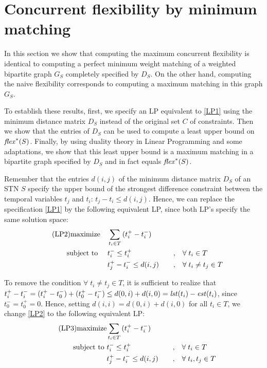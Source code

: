 \section{Concurrent flexibility by minimum matching}
In this section we show that computing the maximum concurrent flexibility is identical to computing a perfect minimum weight matching of a weighted bipartite graph $G_S$ completely specified by $D_S$. On the other hand, computing the naive flexibility corresponds to computing a maximum matching in this graph $G_S$.

To establish these results, first, we specify an LP equivalent to \ref{LP1} using the minimum distance matrix $D_S$ instead of the original set $C$ of constraints. 
Then we show that the entries of $D_S$ can be used to compute a least upper bound on $\mathit{flex}^*(S)$.
Finally, by using duality theory in Linear Programming and some adaptations, we show that this least upper bound is a maximum matching in a bipartite graph specified by $D_S$ and in fact equals $\mathit{flex}^*(S)$.
 
Remember that the entries $d(i,j)$ of the minimum distance matrix $D_S$ of an STN $S$ specify the upper bound of the strongest difference constraint between the temporal variables $t_j$ and $t_i$:
$t_j - t_i \leq d(i,j)$. 
Hence, we can replace the specification \ref{LP1} by the following equivalent LP, since both LP's specify the same solution space:
\begin{alignat*}{2}\label{LP2} \tag{LP2}
\text{maximize}                       &\quad \sum_{t_i \in T}{(t^+_i - t^-_i)}  \\
\text{subject to }  &\quad t^-_i                       \leq t^+_i  &\quad , &\quad \forall\; t_i \in T \notag \\
                           &\quad t^+_j - t^-_i                  \leq  d(i,j)  &\quad , &\quad \forall\; t_i \neq t_j \in T \notag
\end{alignat*}

To remove the condition $\forall\; t_i \neq t_j \in T$, it is sufficient to realize that $
t^+_i - t^-_i = (t^+_i - t^-_0) + (t^+_0 - t^-_i) 
                    \leq d(0,i)+d(i,0) = \mathit{lst}(t_i) -  \mathit{est}(t_i)$,
since $t^-_0 = t^+_0 = 0$.
Hence, setting $ d(i,i) = d(0,i)+d(i,0)$ for all $t_i \in T$, we change \ref{LP2} to the following equivalent LP:
\begin{alignat*}{2}\label{LP4} \tag{LP3}
\text{maximize}                       & \sum_{t_i \in T}{(t^+_i - t^-_i)} & \\
\text{subject to }  &  t^-_i                        \leq t^+_i &\quad, \quad & \forall\; t_i \in T \notag \\
                            & t^+_j - t^-_i                  \leq  d(i,j)  &\quad, \quad  & \forall\; t_i, t_j \in T \notag
\end{alignat*}

